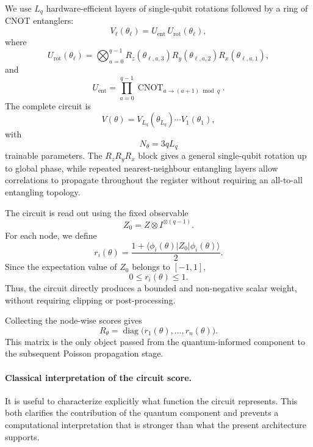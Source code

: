 \documentclass[11pt,a4paper]{article}
\begin{document}
We use \(L_q\) hardware-efficient layers of single-qubit rotations followed by
a ring of CNOT entanglers:
\begin{equation}
V_\ell(\theta_\ell)
=
U_{\mathrm{ent}}\,
U_{\mathrm{rot}}(\theta_\ell),
\label{eq:vqc_layer}
\end{equation}
where
\[
U_{\mathrm{rot}}(\theta_\ell)
=
\bigotimes_{a=0}^{q-1}
R_z(\theta_{\ell,a,3})
R_y(\theta_{\ell,a,2})
R_x(\theta_{\ell,a,1}),
\]
and
\[
U_{\mathrm{ent}}
=
\prod_{a=0}^{q-1}
\operatorname{CNOT}_{a\rightarrow(a+1)\bmod q}.
\]
The complete circuit is
\begin{equation}
V(\theta)
=
V_{L_q}(\theta_{L_q})
\cdots
V_1(\theta_1),
\label{eq:complete_vqc}
\end{equation}
with
\[
N_\theta=3qL_q
\]
trainable parameters. The \(R_zR_yR_x\) block gives a general single-qubit
rotation up to global phase, while repeated nearest-neighbour entangling
layers allow correlations to propagate throughout the register without
requiring an all-to-all entangling topology.

The circuit is read out using the fixed observable
\[
Z_0
=
Z\otimes I^{\otimes(q-1)}.
\]
For each node, we define
\begin{equation}
r_i(\theta)
=
\frac{
1+
\langle\phi_i(\theta)\rvert
Z_0
\lvert\phi_i(\theta)\rangle
}{2}.
\label{eq:quantum_weight}
\end{equation}
Since the expectation value of \(Z_0\) belongs to \([-1,1]\),
\begin{equation}
0\leq r_i(\theta)\leq1.
\end{equation}
Thus, the circuit directly produces a bounded and non-negative scalar weight,
without requiring clipping or post-processing.

Collecting the node-wise scores gives
\begin{equation}
R_\theta
=
\operatorname{diag}
\bigl(
r_1(\theta),\ldots,r_n(\theta)
\bigr).
\label{eq:quantum_regularizer}
\end{equation}
This matrix is the only object passed from the quantum-informed component to
the subsequent Poisson propagation stage.

\paragraph{Classical interpretation of the circuit score.}

It is useful to characterize explicitly what function the circuit represents.
This both clarifies the contribution of the quantum component and prevents a
computational interpretation that is stronger than what the present
architecture supports.
\end{document}
